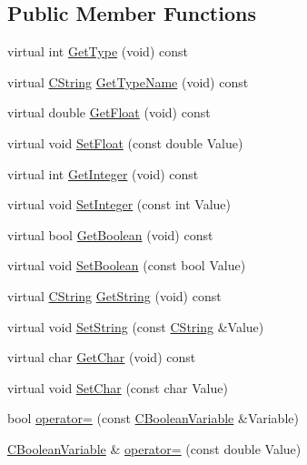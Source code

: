 \subsection*{Public Member Functions}
\begin{DoxyCompactItemize}
\item 
virtual int \hyperlink{classCBooleanVariable_ad1e47ce945773e7059e53a620bc24351}{Get\-Type} (void) const 
\item 
virtual \hyperlink{classCString}{C\-String} \hyperlink{classCBooleanVariable_a72ecdaf420fc78941793d4cab2ed6bed}{Get\-Type\-Name} (void) const 
\item 
virtual double \hyperlink{classCBooleanVariable_ac59dc433ef72caeffa5b81ea66d90da5}{Get\-Float} (void) const 
\item 
virtual void \hyperlink{classCBooleanVariable_a8cb0cdb3b3f8dad9e1b04c88f33367d8}{Set\-Float} (const double Value)
\item 
virtual int \hyperlink{classCBooleanVariable_a35aee52260e1acbdf9639845409b6614}{Get\-Integer} (void) const 
\item 
virtual void \hyperlink{classCBooleanVariable_a56fb37e55eddd15047842f92c4fa501d}{Set\-Integer} (const int Value)
\item 
virtual bool \hyperlink{classCBooleanVariable_aede73252b492061d90e44003f6d944f1}{Get\-Boolean} (void) const 
\item 
virtual void \hyperlink{classCBooleanVariable_a15c508649f6e342640fc008cf43f22db}{Set\-Boolean} (const bool Value)
\item 
virtual \hyperlink{classCString}{C\-String} \hyperlink{classCBooleanVariable_a16efdf664ecbd74b3bc0d518d76585d6}{Get\-String} (void) const 
\item 
virtual void \hyperlink{classCBooleanVariable_aa7362a06640bf84322444e85094ad5ee}{Set\-String} (const \hyperlink{classCString}{C\-String} \&Value)
\item 
virtual char \hyperlink{classCBooleanVariable_a0e9acd743061a594920afabfd6ab6eb6}{Get\-Char} (void) const 
\item 
virtual void \hyperlink{classCBooleanVariable_af22fb31d331ce7d3283abe39c92b1ec1}{Set\-Char} (const char Value)
\item 
bool \hyperlink{classCBooleanVariable_a63cba7ebfbe8782ca83860ff5d03f08b}{operator=} (const \hyperlink{classCBooleanVariable}{C\-Boolean\-Variable} \&Variable)
\item 
\hyperlink{classCBooleanVariable}{C\-Boolean\-Variable} \& \hyperlink{classCBooleanVariable_a13ff940a5bf564ba648858ca0895d159}{operator=} (const double Value)

\end{DoxyCompactItemize}
